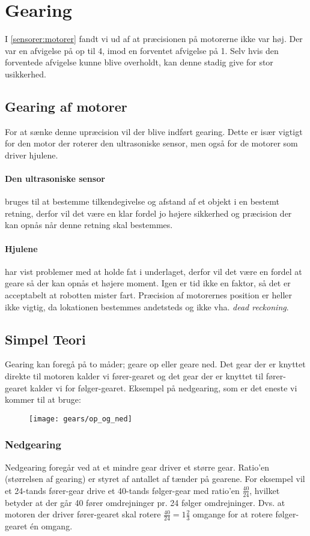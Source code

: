 \section{Gearing}
I \cref{sensorer:motorer} fandt vi ud af at præcisionen på motorerne ikke var høj.
Der var en afvigelse på op til 4\dg, imod en forventet afvigelse på 1\dg.
Selv hvis den forventede afvigelse kunne blive overholdt, kan denne stadig give for stor usikkerhed.

\subsection{Gearing af motorer}
For at sænke denne upræcision vil der blive indført gearing.
Dette er især vigtigt for den motor der roterer den ultrasoniske sensor, men også for de motorer som driver hjulene.

\paragraph{Den ultrasoniske sensor} bruges til at bestemme tilkendegivelse og afstand af et objekt i en bestemt retning, derfor vil det være en klar fordel jo højere sikkerhed og præcision der kan opnås når denne retning skal bestemmes.

\paragraph{Hjulene} har vist problemer med at holde fat i underlaget, derfor vil det være en fordel at geare så der kan opnås et højere moment.
Igen er tid ikke en faktor, så det er acceptabelt at robotten mister fart.
Præcision af motorernes position er heller ikke vigtig, da lokationen bestemmes andetsteds og ikke vha. \textit{dead reckoning}.

\subsection{Simpel Teori}
Gearing kan foregå på to måder; geare op eller geare ned.
Det gear der er knyttet direkte til motoren kalder vi fører-gearet og det gear der er knyttet til fører-gearet kalder vi for følger-gearet.
Eksempel på nedgearing, som er det eneste vi kommer til at bruge:

\begin{figure}[H]
\centering
\texttt{[image: gears/op\_og\_ned]}
\end{figure}

\subsubsection{Nedgearing}
Nedgearing foregår ved at et mindre gear driver et større gear.
Ratio'en (størrelsen af gearing) er styret af antallet af tænder på gearene.
For eksempel vil et 24-tands fører-gear drive et 40-tands følger-gear med ratio'en $\frac{40}{24}$, hvilket betyder at der går 40 fører omdrejninger pr. 24 følger omdrejninger. Dvs. at motoren der driver fører-gearet skal rotere $\frac{40}{24} = 1 \frac{2}{3}$ omgange for at rotere følger-gearet én omgang.

